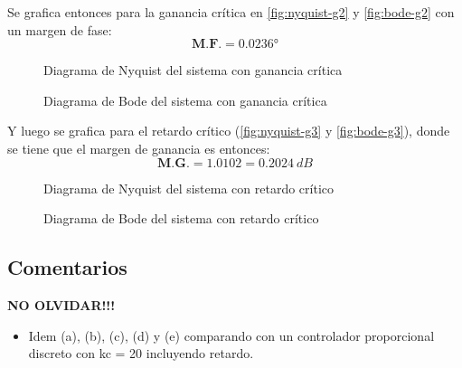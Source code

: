Se grafica entonces para la ganancia crítica en \autoref{fig:nyquist-g2} y \autoref{fig:bode-g2}
con un margen de fase:
\begin{equation}
  \boxed{\textbf{M.F.} = \ang{0.0236}}
\end{equation}

\begin{figure}[h]
  \centering
  
  \caption{Diagrama de Nyquist del sistema con ganancia crítica}
  \label{fig:nyquist-g2}
\end{figure}

\begin{figure}[h]
  \centering
  
  \caption{Diagrama de Bode del sistema con ganancia crítica}
  \label{fig:bode-g2}
\end{figure}

Y luego se grafica para el retardo crítico (\autoref{fig:nyquist-g3} y
\autoref{fig:bode-g3}), donde se tiene que el margen de ganancia es entonces:
\begin{equation}
  \boxed{\textbf{M.G.} = 1.0102 = 0.2024\ \unit{dB}}
\end{equation}

\begin{figure}[h]
  \centering
  
  \caption{Diagrama de Nyquist del sistema con retardo crítico}
  \label{fig:nyquist-g3}
\end{figure}

\begin{figure}[h]
  \centering
  
  \caption{Diagrama de Bode del sistema con retardo crítico}
  \label{fig:bode-g3}
\end{figure}

\FloatBarrier
\subsection{Comentarios}

\textbf{NO OLVIDAR!!!}


\begin{itemize}
  \item Idem (a), (b), (c), (d) y (e) comparando con un controlador proporcional discreto con kc = 20 incluyendo retardo.
\end{itemize}

